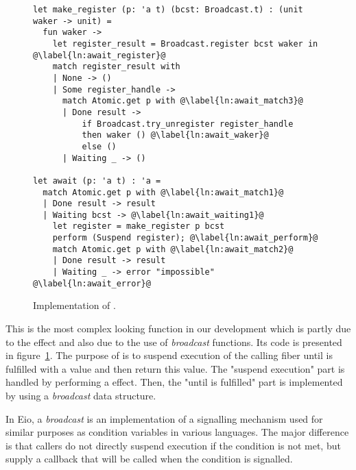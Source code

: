 \begin{figure}[ht]
  \begin{verbatim}
let make_register (p: 'a t) (bcst: Broadcast.t) : (unit waker -> unit) = 
  fun waker ->
    let register_result = Broadcast.register bcst waker in @\label{ln:await_register}@
    match register_result with
    | None -> ()
    | Some register_handle ->
      match Atomic.get p with @\label{ln:await_match3}@
      | Done result ->  
          if Broadcast.try_unregister register_handle
          then waker () @\label{ln:await_waker}@
          else ()
      | Waiting _ -> ()

let await (p: 'a t) : 'a = 
  match Atomic.get p with @\label{ln:await_match1}@
  | Done result -> result
  | Waiting bcst -> @\label{ln:await_waiting1}@
    let register = make_register p bcst
    perform (Suspend register); @\label{ln:await_perform}@
    match Atomic.get p with @\label{ln:await_match2}@
    | Done result -> result 
    | Waiting _ -> error "impossible" @\label{ln:await_error}@
  \end{verbatim}
  \caption{Implementation of .}
  \label{fig:sched-impl-await}
\end{figure}

This is the most complex looking function in our development which is partly due to the \esuspend{} effect and also due to the use of \emph{broadcast} functions.
Its code is presented in figure~\ref{fig:sched-impl-await}.
The purpose of  is to suspend execution of the calling fiber until  is fulfilled with a value and then return this value.
The "suspend execution" part is handled by performing a \esuspend{} effect.
Then, the "until  is fulfilled" part is implemented by using a \emph{broadcast} data structure.

In Eio, a \emph{broadcast} is an implementation of a signalling mechanism used for similar purposes as condition variables in various languages.
The major difference is that callers do not directly suspend execution if the condition is not met, but supply a callback that will be called when the condition is signalled.

